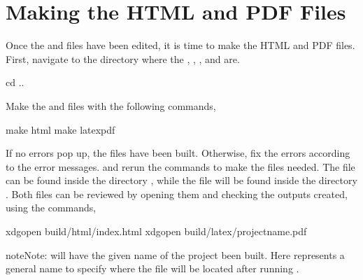 \documentclass[letterpaper,10pt,english]{sphinxhowto}
\begin{document}
\section{Making the HTML and PDF Files}
\label{\detokenize{index:making-the-html-and-pdf-files}}
Once the  and  files have been edited, it is time to make the HTML and PDF files. First, navigate to the  directory where the , , , and  are.

\begin{sphinxVerbatim}[commandchars=\\\{\}]
\PYGZdl{} cd ..
\end{sphinxVerbatim}

Make the  and  files with the following commands,

\begin{sphinxVerbatim}[commandchars=\\\{\}]
\PYGZdl{} make html
\PYGZdl{} make latexpdf
\end{sphinxVerbatim}

If no errors pop up, the files have been built. Otherwise, fix the errors according to the error messages. and re\sphinxhyphen{}run the commands to make the files needed. The  file can be found inside the directory , while the  file will be found inside the directory . Both files can be reviewed by opening them and checking the outputs created, using the  commands,

\begin{sphinxVerbatim}[commandchars=\\\{\}]
\PYGZdl{} xdg\PYGZhy{}open build/html/index.html
\PYGZdl{} xdg\PYGZhy{}open build/latex/project\PYGZhy{}name.pdf
\end{sphinxVerbatim}

\begin{sphinxadmonition}{note}{Note:}
 will have the given name of the project been built. Here  represents a general name to specify where the file will be located after running .
\end{sphinxadmonition}
\end{document}

